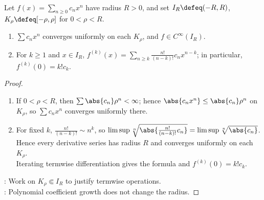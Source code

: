 \begin{theorem} \label{thm:power-series-uniform-differentiation} \\
Let $f(x)=\sum_{n\ge0}c_nx^n$ have radius $R>0$, and set $I_R\defeq(-R,R)$, $K_\rho\defeq[-\rho,\rho]$ for $0<\rho<R$.
\begin{enumerate}[label=(\roman*)]
\setlength{\itemsep}{0pt}
\item $\sum c_nx^n$ converges uniformly on each $K_\rho$, and $f\in C^\infty(I_R)$.
\item For $k\geq1$ and $x\in I_R$, $f^{(k)}(x)=\sum\limits_{n\ge k}\frac{n!}{(n-k)!}c_nx^{n-k}$; in particular, $f^{(k)}(0)=k!c_k$.
\end{enumerate}
\begin{proof}
\begin{enumerate}[label=(\roman*)]
\setlength{\itemsep}{0pt}
\item If $0<\rho<R$, then $\sum\abs{c_n}\rho^n<\infty$; hence $\abs{c_nx^n}\leq\abs{c_n}\rho^n$ on $K_\rho$, so $\sum c_nx^n$ converges uniformly there.
\item For fixed $k$, $\frac{n!}{(n-k)!}\sim n^k$, so $\limsup\sqrt[n]{\abs{\frac{n!}{(n-k)!}c_n}}=\limsup\sqrt[n]{\abs{c_n}}$.\\
Hence every derivative series has radius $R$ and converges uniformly on each $K_\rho$.\\
Iterating termwise differentiation gives the formula and $f^{(k)}(0)=k!c_k$.
\end{enumerate}
: Work on $K_\rho\Subset I_R$ to justify termwise operations.\\
: Polynomial coefficient growth does not change the radius.
\end{proof}
\end{theorem}


